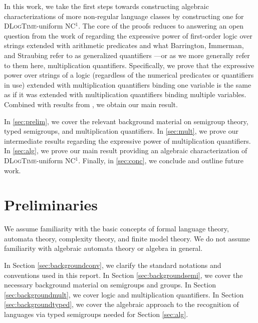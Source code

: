\documentclass[a4paper,UKenglish,cleveref, autoref, thm-restate, anonymous]{lipics-v2021}
\begin{document}
In this work, we take the first steps towards constructing algebraic characterizations of more non-regular language classes by constructing one for \textsc{DLogTime}-uniform NC${}^1$. The core of the proofs reduces to answering an open question from the work of \cite{lautemann2001descriptive} regarding the expressive power of first-order logic over strings extended with arithmetic predicates and what Barrington, Immerman, and Straubing refer to as generalized quantifiers \cite{barrington1990uniformity}---or as we more generally refer to them here, multiplication quantifiers. Specifically, we prove that the expressive power over strings of a logic (regardless of the numerical predicates or quantifiers in use) extended with multiplication quantifiers binding one variable is the same as if it was extended with multiplication quantifiers binding multiple variables. Combined with results from \cite{behle2007linear,krebs2008typed}, we obtain our main result.

In \autoref{sec:prelim}, we cover the relevant background material on semigroup theory, typed semigroups, and multiplication quantifiers. In \autoref{sec:mult}, we prove our intermediate results regarding the expressive power of multiplication quantifiers. In \autoref{sec:alg}, we prove our main result providing an algebraic characterization of \textsc{DLogTime}-uniform NC${}^1$. Finally, in \autoref{sec:conc}, we conclude and outline future work.


\section{Preliminaries}\label{sec:prelim}

We assume familiarity with the basic concepts of formal language theory, automata theory, complexity theory, and finite model theory. We do not assume familiarity with algebraic automata theory or algebra in general. 

In Section \ref{sec:backgroundconv}, we clarify the standard notations and conventions used in this report. In Section \ref{sec:backgroundsemi}, we cover the necessary background material on semigroups and groups. In Section \ref{sec:backgroundmult}, we cover logic and multiplication quantifiers. In Section \ref{sec:backgroundtyped}, we cover the algebraic approach to the recognition of languages via typed semigroups needed for Section \ref{sec:alg}.
\end{document}
